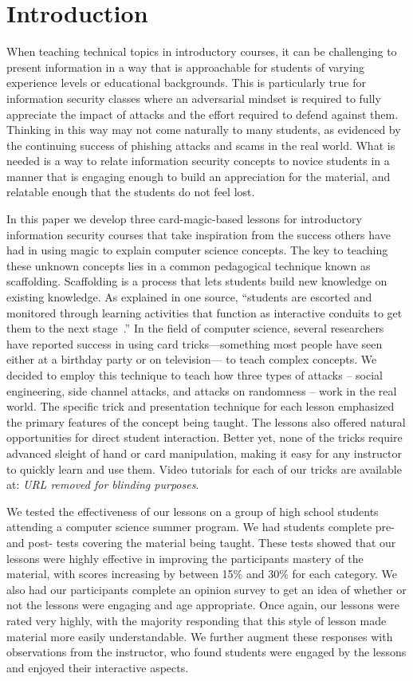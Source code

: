 \section{Introduction}
\label{SEC:introduction}

When teaching technical topics
in introductory courses,
it can be challenging
to present information
in a way that is approachable
for students of varying
experience levels
or educational backgrounds.
This is particularly true
for information security classes
where an adversarial mindset
is required
to fully appreciate the impact of attacks and the effort required to
defend against them.
Thinking in this way
may not come naturally
to many students,
as evidenced
by the continuing success of phishing attacks
and scams in the real world.
What is needed
is a way
to relate information security concepts
to novice students
in a manner
that is engaging enough
to build an appreciation for the material,
and relatable enough that the students do not feel lost.

In this paper
we develop three card-magic-based lessons
for introductory information security courses
that take inspiration
from the success others have had
in using magic
to explain computer science concepts.
The key to teaching these unknown concepts
lies in a common pedagogical technique
known as scaffolding.
Scaffolding is a process that lets students build
new knowledge on existing knowledge.
As explained in one source,
``students are escorted and monitored through learning
activities that function as interactive conduits to get
them to the next stage~\cite{raymond2000}.''
In the field of computer science,
several researchers have reported success in using card
tricks—something most people
have seen either at a birthday party
or on television— to teach complex concepts.
We decided to employ this technique to teach how three types
of attacks -- social engineering, side channel attacks, and attacks on
randomness -- work in the real world.
The specific trick and presentation technique
for each lesson emphasized the primary
features of the concept being taught.
The lessons also offered natural opportunities
for direct student interaction.
Better yet, none of the tricks require advanced sleight of hand
or card manipulation,
making it easy for any instructor to quickly learn and use them.
Video tutorials for each of our tricks are available at: \textit{URL removed
for blinding purposes}.


We tested the effectiveness of our lessons on
a group of high school students
attending a computer science summer program.
We had students complete pre- and post- tests covering the
material being taught.  These tests showed that our lessons were highly
effective in improving the participants mastery of the material,
with scores
increasing by between 15\% and 30\% for each category.
We also had our participants complete an opinion survey to get an idea of
whether or not the lessons were engaging and age appropriate.  Once again, our
lessons were rated very highly,
with the majority responding that this style of lesson made material
more easily understandable.
We further augment these responses
with observations
from the instructor,
who found students were engaged by the lessons and enjoyed their interactive
aspects.


